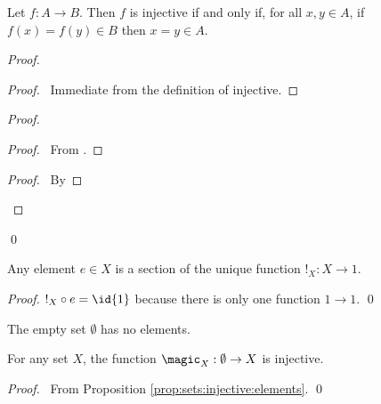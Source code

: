 \begin{prop}
  \label{prop:sets:injective:elements}
  Let $f : A \rightarrow B$. Then $f$ is injective if and only if, for all $x, y \in A$, if $f(x) = f(y) \in B$ then $x = y \in A$.
\end{prop}

\begin{proof}
  \pf
  \begin{proof}
    \pf\ Immediate from the definition of injective.
  \end{proof}
  \begin{proof}
    \begin{proof}
      \pf\ From .
    \end{proof}
    \begin{proof}
      \pf\ By 
    \end{proof}
  \end{proof}
  \qed
\end{proof}

\begin{prop}
  Any element $e \in X$ is a section of the unique function $!_X : X \rightarrow 1$.
\end{prop}

\begin{proof}
  \pf
  $!_X \circ e = \id{1}$ because there is only one function $1 \rightarrow 1$.
  \qed
\end{proof}

\begin{ax}
 The empty set $\emptyset$ has no elements.
\end{ax}

\begin{prop}
  For any set $X$, the function $\magic_X : \emptyset \rightarrow X$ is injective.
\end{prop}

\begin{proof}
  \pf\ From Proposition \ref{prop:sets:injective:elements}. \qed
\end{proof}

